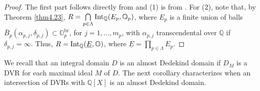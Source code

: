 \documentclass[10pt]{article}
\numberwithin{equation}{section}
\theoremstyle{definition}
\theoremstyle{definition}
\newcommand{\Q}{\mathbb{Q}}
\newcommand{\Z}{\mathbb{Z}}
\renewcommand{\O}{\mathbb{O}}
\newcommand{\Int}{\textnormal{Int}}
\newcommand{\IntQ}{\Int_{\Q}}
\newcommand{\uE}{\underline{E}}
\newcommand{\br}{\text{br}}
\newcommand\rc { \color{red}}
\newcommand\bc { \color{blue}}
\begin{document}
\begin{proof}
The first part follows directly from \cite[Proposition 2.2(3)]{Chang}
and (1) is from \cite[Corollary 2.3]{Chang}.
For (2), note that, by Theorem \ref{thm4.23}, $R = \bigcap\limits_{p \in \Lambda}\IntQ(E_p,\O_p)$,
 where $E_p$ is a finite union of balls $\bar B_p(\alpha_{p,j},\delta_{p,j})\subset\O_p^{\br}$, for $j=1,\ldots,m_p$, with  $\alpha_{p,j}$ transcendental over $\Q$ if $\delta_{p,j} =\infty$. Thus, $R = \IntQ(\uE,\O)$, where $\uE=\prod\limits_{p\in\Lambda} E_p$.
\end{proof}



 We recall that an integral domain $D$ is an almost Dedekind domain if $D_M$ is a DVR for each maximal ideal $M$ of $D$. The next corollary characterizes when an intersection of DVRs with $\Q[X]$ is an almost Dedekind domain.
\end{document}
